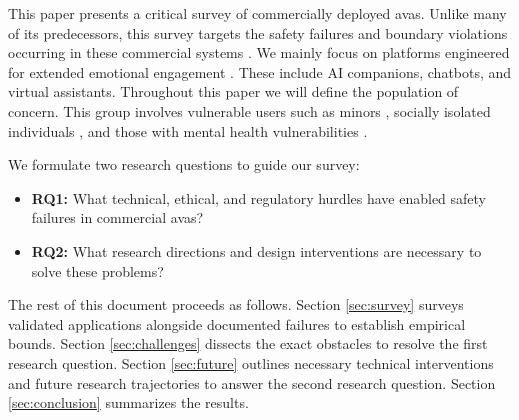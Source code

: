 This paper presents a critical survey of commercially deployed \gls{avas}. Unlike many of its predecessors, this survey targets the safety failures and boundary violations occurring in these commercial systems \cite[p.~621, ~626--627]{kurian_no_2024}. We mainly focus on platforms engineered for extended emotional engagement \cite[p.~3]{zhang_dark_2025}. These include AI companions, chatbots, and virtual assistants. Throughout this paper we will define the population of concern. This group involves vulnerable users such as minors \cite[p.~2]{kurian_designing_2025}\cite[p.~4]{kim_i_2025}, socially isolated individuals \cite[p.~80]{branch_ai_2025}, and those with mental health vulnerabilities \cite[p.~6]{sobowale_evaluating_2025}.

We formulate two research questions to guide our survey:

\begin{itemize}
    \item \textbf{RQ1:} What technical, ethical, and regulatory hurdles have enabled safety failures in commercial \gls{avas}?
    \item \textbf{RQ2:} What research directions and design interventions are necessary to solve these problems?
\end{itemize}

The rest of this document proceeds as follows. Section \ref{sec:survey} surveys validated applications alongside documented failures to establish empirical bounds. Section \ref{sec:challenges} dissects the exact obstacles to resolve the first research question. Section \ref{sec:future} outlines necessary technical interventions and future research trajectories to answer the second research question. Section \ref{sec:conclusion} summarizes the results.